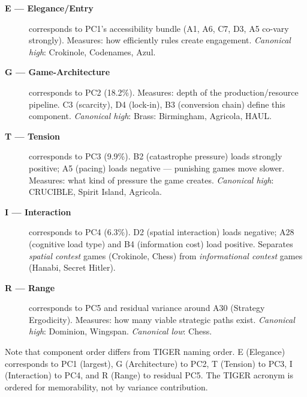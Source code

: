 \begin{description}
  \item[\textbf{E — Elegance/Entry}] corresponds to PC1's accessibility bundle
    (A1, A6, C7, D3, A5 co-vary strongly). Measures: how efficiently rules create engagement.
    \emph{Canonical high}: Crokinole, Codenames, Azul.

  \item[\textbf{G — Game-Architecture}] corresponds to PC2 (18.2\%). Measures: depth of
    the production/resource pipeline. C3 (scarcity), D4 (lock-in), B3 (conversion chain)
    define this component. \emph{Canonical high}: Brass: Birmingham, Agricola, HAUL.

  \item[\textbf{T — Tension}] corresponds to PC3 (9.9\%). B2 (catastrophe pressure) loads
    strongly positive; A5 (pacing) loads negative — punishing games move slower.
    Measures: what kind of pressure the game creates.
    \emph{Canonical high}: CRUCIBLE, Spirit Island, Agricola.

  \item[\textbf{I — Interaction}] corresponds to PC4 (6.3\%). D2 (spatial interaction)
    loads negative; A28 (cognitive load type) and B4 (information cost) load positive.
    Separates \emph{spatial contest} games (Crokinole, Chess) from \emph{informational
    contest} games (Hanabi, Secret Hitler).

  \item[\textbf{R — Range}] corresponds to PC5 and residual variance around A30
    (Strategy Ergodicity). Measures: how many viable strategic paths exist.
    \emph{Canonical high}: Dominion, Wingspan. \emph{Canonical low}: Chess.
\end{description}

Note that component order differs from TIGER naming order.
E (Elegance) corresponds to PC1 (largest), G (Architecture) to PC2,
T (Tension) to PC3, I (Interaction) to PC4, and R (Range) to residual PC5.
The TIGER acronym is ordered for memorability, not by variance contribution.
